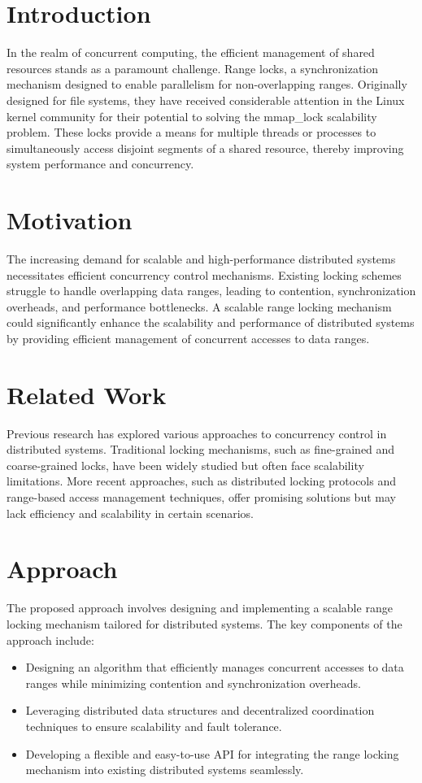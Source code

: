 \section{Introduction}
In the realm of concurrent computing, the efficient management of shared resources stands as a paramount challenge. Range locks, a synchronization mechanism designed to enable parallelism for non-overlapping
ranges. Originally designed for file systems, they have received considerable attention in the Linux kernel community for their potential to solving the mmap_lock scalability problem\cite{mmapLock2022}. These locks provide a means for multiple threads or processes to simultaneously access disjoint segments of a shared resource, thereby improving system performance and concurrency.


\section{Motivation}
The increasing demand for scalable and high-performance distributed systems necessitates efficient concurrency control mechanisms. Existing locking schemes struggle to handle overlapping data ranges, leading to contention, synchronization overheads, and performance bottlenecks. A scalable range locking mechanism could significantly enhance the scalability and performance of distributed systems by providing efficient management of concurrent accesses to data ranges.

\section{Related Work}
Previous research has explored various approaches to concurrency control in distributed systems. Traditional locking mechanisms, such as fine-grained and coarse-grained locks, have been widely studied but often face scalability limitations. More recent approaches, such as distributed locking protocols and range-based access management techniques, offer promising solutions but may lack efficiency and scalability in certain scenarios.

\section{Approach}
The proposed approach involves designing and implementing a scalable range locking mechanism tailored for distributed systems. The key components of the approach include:
\begin{itemize}
    \item Designing an algorithm that efficiently manages concurrent accesses to data ranges while minimizing contention and synchronization overheads.
    \item Leveraging distributed data structures and decentralized coordination techniques to ensure scalability and fault tolerance.
    \item Developing a flexible and easy-to-use API for integrating the range locking mechanism into existing distributed systems seamlessly.
\end{itemize}

